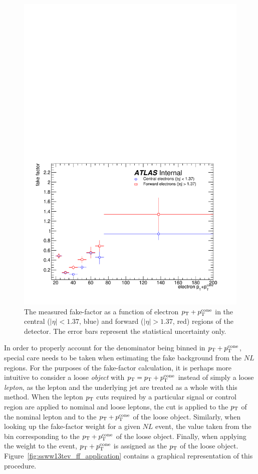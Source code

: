 \begin{figure}[htbp]
  \centering
  \includegraphics[width=.6\textwidth]{figs/ssww_13tev/backgrounds/ff/elec_ff}
  \caption{The measured fake-factor as a function of electron $p_{\mathrm{T}}+p_{\mathrm{T}}^{\textrm{cone}}$ in the central ($|\eta|<1.37$, blue) and forward ($|\eta| > 1.37$, red) regions of the detector.  The error bars represent the statistical uncertainty only.}
  \label{fig:ssww13tev_ff_elec}
\end{figure}

In order to properly account for the denominator being binned in $p_{\mathrm{T}}+p_{\mathrm{T}}^{\textrm{cone}}$, special care needs to be taken when estimating the fake background from the $NL$ regions.
For the purposes of the fake-factor calculation, it is perhaps more intuitive to consider a loose \emph{object} with $p_{\mathrm{T}}=p_{\mathrm{T}}+p_{\mathrm{T}}^{\textrm{cone}}$ instead of simply a loose \emph{lepton}, as the lepton and the underlying jet are treated as a whole with this method.
When the lepton $p_{\mathrm{T}}$ cuts required by a particular signal or control region are applied to nominal and loose leptons, the cut is applied to the $p_{\mathrm{T}}$ of the nominal lepton and to the $p_{\mathrm{T}}+p_{\mathrm{T}}^{\textrm{cone}}$ of the loose object.
Similarly, when looking up the fake-factor weight for a given $NL$ event, the value taken from the bin corresponding to the $p_{\mathrm{T}}+p_{\mathrm{T}}^{\textrm{cone}}$ of the loose object.
Finally, when applying the weight to the event, $p_{\mathrm{T}}+p_{\mathrm{T}}^{\textrm{cone}}$ is assigned as the $p_{\mathrm{T}}$ of the loose object.
Figure~\ref{fig:ssww13tev_ff_application} contains a graphical representation of this procedure.

